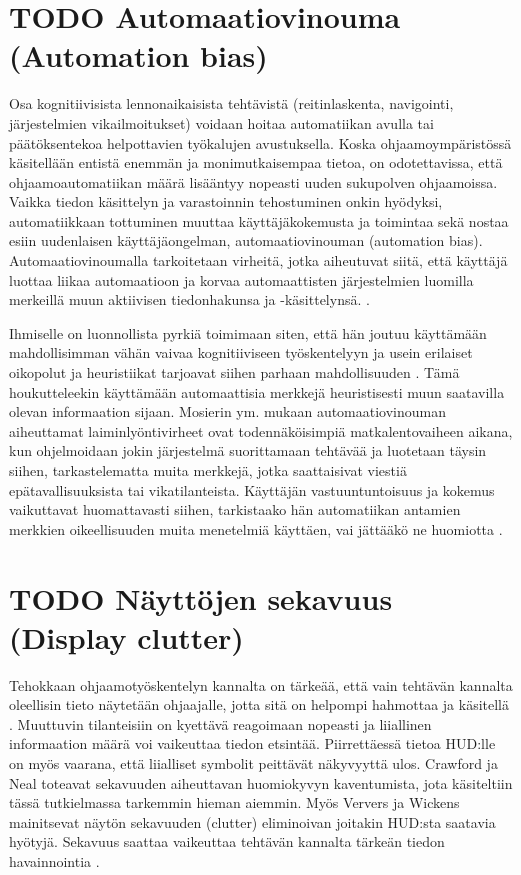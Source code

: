 \documentclass[utf8,bachelor,manualbib]{gradu3}
\begin{document}
\section{TODO Automaatiovinouma (Automation bias)}

Osa kognitiivisista lennonaikaisista tehtävistä (reitinlaskenta, navigointi, järjestelmien vikailmoitukset) voidaan hoitaa automatiikan avulla tai päätöksentekoa helpottavien työkalujen avustuksella. Koska ohjaamoympäristössä käsitellään entistä enemmän ja monimutkaisempaa tietoa, on odotettavissa, että ohjaamoautomatiikan määrä lisääntyy nopeasti uuden sukupolven ohjaamoissa. Vaikka tiedon käsittelyn ja varastoinnin tehostuminen onkin hyödyksi, automatiikkaan tottuminen muuttaa käyttäjäkokemusta ja toimintaa sekä nostaa esiin uudenlaisen käyttäjäongelman, automaatiovinouman (automation bias). Automaatiovinoumalla tarkoitetaan virheitä, jotka aiheutuvat siitä, että käyttäjä luottaa liikaa automaatioon ja korvaa automaattisten järjestelmien luomilla merkeillä muun aktiivisen tiedonhakunsa ja -käsittelynsä. \citep{mosierym1998}.

Ihmiselle on luonnollista pyrkiä toimimaan siten, että hän joutuu käyttämään mahdollisimman vähän vaivaa kognitiiviseen työskentelyyn ja usein erilaiset oikopolut ja heuristiikat tarjoavat siihen parhaan mahdollisuuden \citep{fisketaylor1994}. Tämä houkutteleekin käyttämään automaattisia merkkejä heuristisesti muun saatavilla olevan informaation sijaan. Mosierin ym. \citeyearpar{mosierym1994} mukaan automaatiovinouman aiheuttamat laiminlyöntivirheet ovat todennäköisimpiä matkalentovaiheen aikana, kun ohjelmoidaan jokin järjestelmä suorittamaan tehtävää ja luotetaan täysin siihen, tarkastelematta muita merkkejä, jotka saattaisivat viestiä epätavallisuuksista tai vikatilanteista. Käyttäjän vastuuntuntoisuus ja kokemus vaikuttavat huomattavasti siihen, tarkistaako hän automatiikan antamien merkkien oikeellisuuden muita menetelmiä käyttäen, vai jättääkö ne huomiotta \citep{mosierym1998}.

\section{TODO Näyttöjen sekavuus (Display clutter)}

Tehokkaan ohjaamotyöskentelyn kannalta on tärkeää, että vain tehtävän kannalta oleellisin tieto näytetään ohjaajalle, jotta sitä on helpompi hahmottaa ja käsitellä \citep{ververswickens1998}. Muuttuvin tilanteisiin on kyettävä reagoimaan nopeasti ja liiallinen informaation määrä voi vaikeuttaa tiedon etsintää. Piirrettäessä tietoa HUD:lle on myös vaarana, että liialliset symbolit peittävät näkyvyyttä ulos. Crawford ja Neal \citeyearpar{crawfordneal2006} toteavat sekavuuden aiheuttavan huomiokyvyn kaventumista, jota käsiteltiin tässä tutkielmassa tarkemmin hieman aiemmin. Myös Ververs ja Wickens \citeyearpar{ververswickens1996} mainitsevat näytön sekavuuden (clutter) eliminoivan joitakin HUD:sta saatavia hyötyjä. Sekavuus saattaa vaikeuttaa tehtävän kannalta tärkeän tiedon havainnointia \citep{nikolicym2004, stelzerwickens2006, wickensym2003}.
\end{document}
